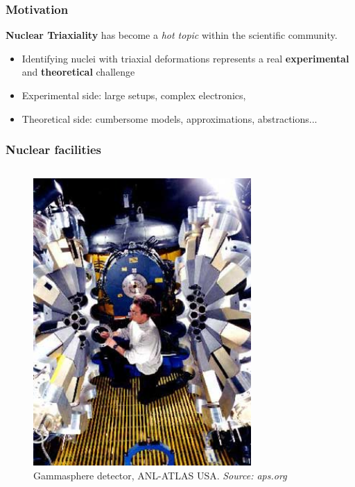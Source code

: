 \documentclass[
	11pt, %
]{beamer}
\begin{document}
\begin{frame}
	\frametitle{Motivation}

		\textbf{Nuclear Triaxiality} has become a \emph{hot topic} within the scientific community.
		\begin{itemize}
			\item Identifying nuclei with triaxial deformations represents a real \textbf{experimental} and \textbf{theoretical} challenge
			\item Experimental side: large setups, complex electronics, 
			\item Theoretical side: cumbersome models, approximations, abstractions...
		\end{itemize}

\end{frame}


\begin{frame}
	\frametitle{Nuclear facilities}
	\begin{columns}
		\begin{figure}
		\centering
		\includegraphics[width=0.86\textwidth]{figures/gsfig.jpg}
		\caption{Gammasphere detector, ANL-ATLAS USA. \textit{Source: aps.org}}
	\end{figure}

\end{columns}
\end{frame}
\end{document}
